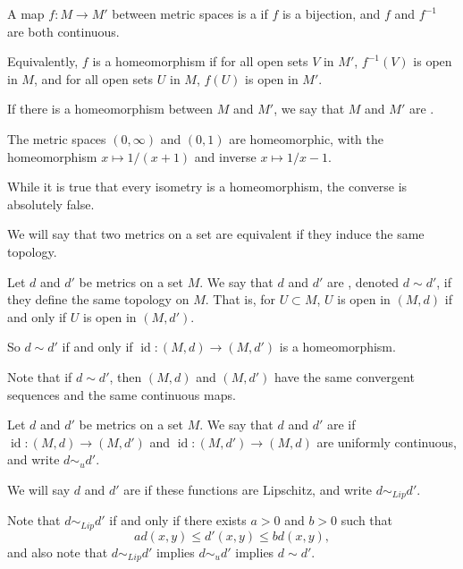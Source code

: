 \documentclass[a4paper]{scrartcl}
\begin{document}
\begin{definition}[Homeomorphism]
    A map $f: M \rightarrow M'$ between metric spaces is a  if $f$ is a bijection, and $f$ and $f^{-1}$ are both continuous.

    Equivalently, $f$ is a homeomorphism if for all open sets $V$ in $M'$, $f^{-1}(V)$ is open in $M$, and for all open sets $U$ in $M$, $f(U)$ is open in $M'$.

    If there is a homeomorphism between $M$ and $M'$, we say that $M$ and $M'$ are .
\end{definition}

\begin{example}
    The metric spaces $(0, \infty)$ and $(0, 1)$ are homeomorphic, with the homeomorphism $x \mapsto 1/(x + 1)$ and inverse $x \mapsto 1/x - 1$.
\end{example}

While it is true that every isometry is a homeomorphism, the converse is absolutely false.

We will say that two metrics on a set are equivalent if they induce the same topology.

\begin{definition}
    Let $d$ and $d'$ be metrics on a set $M$. We say that $d$ and $d'$ are , denoted $d \sim d'$, if they define the same topology on $M$. That is, for $U \subset M$, $U$ is open in $(M, d)$ if and only if $U$ is open in $(M, d')$.
\end{definition}

So $d \sim d'$ if and only if $\operatorname{id}: (M, d) \rightarrow (M, d')$ is a homeomorphism. 

Note that if $d \sim d'$, then $(M, d)$ and $(M, d')$ have the same convergent sequences and the same continuous maps.

\begin{definition}
    Let $d$ and $d'$ be metrics on a set $M$. We say that $d$ and $d'$ are  if $\operatorname{id}: (M, d) \rightarrow (M, d')$ and $\operatorname{id}: (M, d') \rightarrow (M, d)$ are uniformly continuous, and write $d \sim_u d'$.

    We will say $d$ and $d'$ are  if these functions are Lipschitz, and write $d \sim_{Lip} d'$.
\end{definition}

Note that $d \sim_{Lip} d'$ if and only if there exists $a > 0$ and $b > 0$ such that
$$
a d(x, y) \leq d'(x, y) \leq b d(x, y),
$$
and also note that $d \sim_{Lip} d'$ implies $d \sim_u d'$ implies $d \sim d'$.
\end{document}

